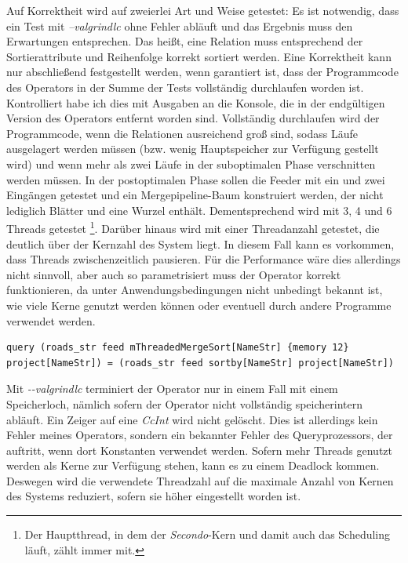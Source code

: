 \documentclass[a4paper,12pt,twoside]{article}
\newcommand{\Fb}[1]{\textit{#1}} %
\begin{document}
Auf Korrektheit wird auf zweierlei Art und Weise getestet: Es ist notwendig, dass ein Test mit \Fb{--valgrindlc} ohne Fehler abläuft und das Ergebnis muss den Erwartungen entsprechen. Das heißt, eine Relation muss entsprechend der Sortierattribute und Reihenfolge korrekt sortiert werden. Eine Korrektheit kann nur abschließend festgestellt werden, wenn garantiert ist, dass der Programmcode des Operators in der Summe der Tests vollständig durchlaufen worden ist. Kontrolliert habe ich dies mit Ausgaben an die Konsole, die in der endgültigen Version des Operators entfernt worden sind. Vollständig durchlaufen wird der Programmcode, wenn die Relationen ausreichend groß sind, sodass Läufe ausgelagert werden müssen (bzw. wenig Hauptspeicher zur Verfügung gestellt wird) und wenn mehr als zwei Läufe in der suboptimalen Phase verschnitten werden müssen. In der postoptimalen Phase sollen die Feeder mit ein und zwei Eingängen getestet und ein Mergepipeline-Baum konstruiert werden, der nicht lediglich Blätter und eine Wurzel enthält. Dementsprechend wird mit 3, 4 und 6 Threads getestet \footnote{Der Hauptthread, in dem der \Fb{Secondo}-Kern und damit auch das Scheduling läuft, zählt immer mit.}. Darüber hinaus wird mit einer Threadanzahl getestet, die deutlich über der Kernzahl des System liegt. In diesem Fall kann es vorkommen, dass Threads zwischenzeitlich pausieren. Für die Performance wäre dies allerdings nicht sinnvoll, aber auch so parametrisiert muss der Operator korrekt funktionieren, da unter Anwendungsbedingungen nicht unbedingt bekannt ist, wie viele Kerne genutzt werden können oder eventuell durch andere Programme verwendet werden.

\begin{minipage}{0.95\textwidth}
	\begin{lstlisting}[caption={Beispiel Testqueries für den Sort-Operator.}, label=list:testsort]
	query (roads_str feed mThreadedMergeSort[NameStr] {memory 12} project[NameStr]) = (roads_str feed sortby[NameStr] project[NameStr]) 
	\end{lstlisting}
\end{minipage}

Mit \Fb{-{}-valgrindlc} terminiert der Operator nur in einem Fall mit einem Speicherloch, nämlich sofern der Operator nicht vollständig speicherintern abläuft. Ein Zeiger auf eine \Fb{CcInt} wird nicht gelöscht. Dies ist allerdings kein Fehler meines Operators, sondern ein bekannter Fehler des Queryprozessors, der auftritt, wenn dort Konstanten verwendet werden. Sofern mehr Threads genutzt werden als Kerne zur Verfügung stehen, kann es zu einem Deadlock kommen. Deswegen wird die verwendete Threadzahl auf die maximale Anzahl von Kernen des Systems reduziert, sofern sie höher eingestellt worden ist. 
\end{document}

